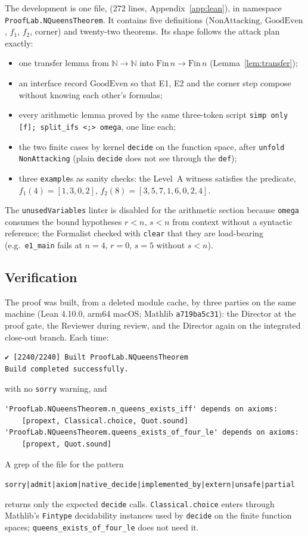 \documentclass[11pt,a4paper]{article}
\theoremstyle{definition}
\theoremstyle{remark}
\newcommand{\lean}[1]{\texttt{#1}}
\newcommand{\N}{\mathbb{N}}
\newcommand{\Fin}{\mathrm{Fin}\,}
\newcommand{\NonAttacking}{\mathrm{NonAttacking}}
\newcommand{\GoodEven}{\mathrm{GoodEven}}
\begin{document}
The development is one file, 
(272 lines, Appendix~\ref{app:lean}), in namespace \lean{ProofLab.NQueensTheorem}. It
contains five definitions ($\NonAttacking$, $\GoodEven$, $f_1$, $f_2$, $\mathrm{corner}$)
and twenty-two theorems. Its shape follows the attack plan exactly:
\begin{itemize}[nosep]
\item one transfer lemma from $\N\to\N$ into $\Fin n\to\Fin n$ (Lemma~\ref{lem:transfer});
\item an interface record $\GoodEven$ so that E1, E2 and the corner step compose without
knowing each other's formulas;
\item every arithmetic lemma proved by the same three-token script
\lean{simp only [f]; split\_ifs <;> omega}, one line each;
\item the two finite cases by kernel \lean{decide} on the function space, after
\lean{unfold NonAttacking} (plain \lean{decide} does not see through the \lean{def});
\item three \lean{example}s as sanity checks: the Level~A witness satisfies the predicate,
$f_1(4)=[1,3,0,2]$, $f_2(8)=[3,5,7,1,6,0,2,4]$.
\end{itemize}
The \lean{unusedVariables} linter is disabled for the arithmetic section because
\lean{omega} consumes the bound hypotheses $r<n$, $s<n$ from context without a syntactic
reference; the Formalist checked with \lean{clear} that they are load-bearing (e.g.\
\lean{e1\_main} fails at $n=4$, $r=0$, $s=5$ without $s<n$).

\subsection{Verification}
\label{sec:verification}

The proof was built, from a deleted module cache, by three parties on the same machine
(Lean 4.10.0, arm64 macOS; Mathlib \texttt{a719ba5c31}): the Director at the proof gate,
the Reviewer during review, and the Director again on the integrated close-out branch.
Each time:
\begin{Verbatim}
✔ [2240/2240] Built ProofLab.NQueensTheorem
Build completed successfully.
\end{Verbatim}
with no \lean{sorry} warning, and
\begin{Verbatim}
'ProofLab.NQueensTheorem.n_queens_exists_iff' depends on axioms:
    [propext, Classical.choice, Quot.sound]
'ProofLab.NQueensTheorem.queens_exists_of_four_le' depends on axioms:
    [propext, Quot.sound]
\end{Verbatim}
A grep of the file for the pattern
\begin{center}\small\texttt{sorry|admit|axiom|native\_decide|implemented\_by|extern|unsafe|partial}\end{center}
returns only the expected \lean{decide} calls. \lean{Classical.choice} enters through
Mathlib's \lean{Fintype} decidability instances used by \lean{decide} on the finite
function spaces; \lean{queens\_exists\_of\_four\_le} does not need it.
\end{document}
